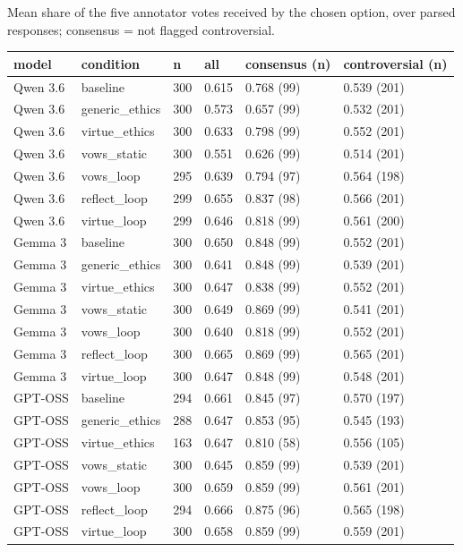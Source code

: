 \documentclass[
  11pt,
]{article}
\newcounter{none} %
\begin{document}
Mean share of the five annotator votes received by the chosen option,
over parsed responses; consensus = not flagged controversial.

{\def\LTcaptype{none} %
\begin{longtable}[]{@{}llllll@{}}
\toprule\noalign{}
model & condition & n & all & consensus (n) & controversial (n) \\
\midrule\noalign{}
\endhead
\bottomrule\noalign{}
\endlastfoot
Qwen 3.6 & baseline & 300 & 0.615 & 0.768 (99) & 0.539 (201) \\
Qwen 3.6 & generic\_ethics & 300 & 0.573 & 0.657 (99) & 0.532 (201) \\
Qwen 3.6 & virtue\_ethics & 300 & 0.633 & 0.798 (99) & 0.552 (201) \\
Qwen 3.6 & vows\_static & 300 & 0.551 & 0.626 (99) & 0.514 (201) \\
Qwen 3.6 & vows\_loop & 295 & 0.639 & 0.794 (97) & 0.564 (198) \\
Qwen 3.6 & reflect\_loop & 299 & 0.655 & 0.837 (98) & 0.566 (201) \\
Qwen 3.6 & virtue\_loop & 299 & 0.646 & 0.818 (99) & 0.561 (200) \\
Gemma 3 & baseline & 300 & 0.650 & 0.848 (99) & 0.552 (201) \\
Gemma 3 & generic\_ethics & 300 & 0.641 & 0.848 (99) & 0.539 (201) \\
Gemma 3 & virtue\_ethics & 300 & 0.647 & 0.838 (99) & 0.552 (201) \\
Gemma 3 & vows\_static & 300 & 0.649 & 0.869 (99) & 0.541 (201) \\
Gemma 3 & vows\_loop & 300 & 0.640 & 0.818 (99) & 0.552 (201) \\
Gemma 3 & reflect\_loop & 300 & 0.665 & 0.869 (99) & 0.565 (201) \\
Gemma 3 & virtue\_loop & 300 & 0.647 & 0.848 (99) & 0.548 (201) \\
GPT-OSS & baseline & 294 & 0.661 & 0.845 (97) & 0.570 (197) \\
GPT-OSS & generic\_ethics & 288 & 0.647 & 0.853 (95) & 0.545 (193) \\
GPT-OSS & virtue\_ethics & 163 & 0.647 & 0.810 (58) & 0.556 (105) \\
GPT-OSS & vows\_static & 300 & 0.645 & 0.859 (99) & 0.539 (201) \\
GPT-OSS & vows\_loop & 300 & 0.659 & 0.859 (99) & 0.561 (201) \\
GPT-OSS & reflect\_loop & 294 & 0.666 & 0.875 (96) & 0.565 (198) \\
GPT-OSS & virtue\_loop & 300 & 0.658 & 0.859 (99) & 0.559 (201) \\
\end{longtable}
}
\end{document}
